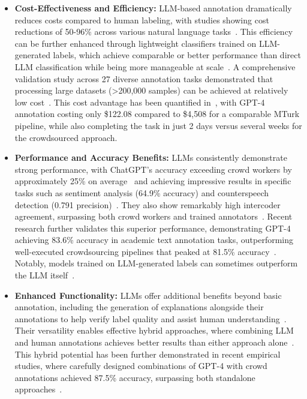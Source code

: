 \documentclass[11pt]{article}
\begin{document}
\begin{itemize}
    \item \textbf{Cost-Effectiveness and Efficiency:} LLM-based annotation dramatically reduces costs compared to human labeling, with studies showing cost reductions of 50-96\% across various natural language tasks~\cite{DBLP:conf/emnlp/WangLXZZ21}. This efficiency can be further enhanced through lightweight classifiers trained on LLM-generated labels, which achieve comparable or better performance than direct LLM classification while being more manageable at scale~\cite{DBLP:conf/kdd/WanSJKCNSSWYABJ24}. A comprehensive validation study across 27 diverse annotation tasks demonstrated that processing large datasets (>200,000 samples) can be achieved at relatively low cost~\cite{DBLP:journals/corr/abs-2306-00176}. This cost advantage has been quantified in~\cite{DBLP:conf/chi/HeHDRH24}, with GPT-4 annotation costing only \$122.08 compared to \$4,508 for a comparable MTurk pipeline, while also completing the task in just 2 days versus several weeks for the crowdsourced approach.

    \item \textbf{Performance and Accuracy Benefits:} LLMs consistently demonstrate strong performance, with ChatGPT's accuracy exceeding crowd workers by approximately 25\% on average~\cite{DBLP:journals/corr/abs-2303-15056} and achieving impressive results in specific tasks such as sentiment analysis (64.9\% accuracy) and counterspeech detection (0.791 precision)~\cite{DBLP:journals/corr/abs-2304-10145}. They also show remarkably high intercoder agreement, surpassing both crowd workers and trained annotators~\cite{DBLP:journals/corr/abs-2303-15056}. Recent research further validates this superior performance, demonstrating GPT-4 achieving 83.6\% accuracy in academic text annotation tasks, outperforming well-executed crowdsourcing pipelines that peaked at 81.5\% accuracy~\cite{DBLP:conf/chi/HeHDRH24}. Notably, models trained on LLM-generated labels can sometimes outperform the LLM itself~\cite{DBLP:conf/emnlp/WangLXZZ21}.

    \item \textbf{Enhanced Functionality:} LLMs offer additional benefits beyond basic annotation, including the generation of explanations alongside their annotations to help verify label quality and assist human understanding~\cite{DBLP:conf/chi/Wang0RMM24}. Their versatility enables effective hybrid approaches, where combining LLM and human annotations achieves better results than either approach alone~\cite{DBLP:conf/emnlp/WangLXZZ21}. This hybrid potential has been further demonstrated in recent empirical studies, where carefully designed combinations of GPT-4 with crowd annotations achieved 87.5\% accuracy, surpassing both standalone approaches~\cite{DBLP:conf/chi/HeHDRH24}.
\end{itemize}
\end{document}
